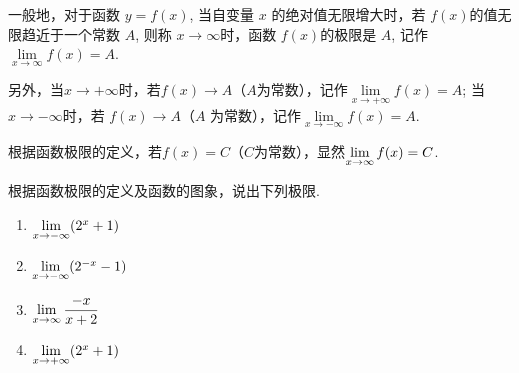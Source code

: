 一般地，对于函数 $y=f(x)$, 当自变量 $x$ 的绝对值无限增大时，若 $f(x)$的值无限趋近于一个常数 $A$, 则称 $x\to\infty$时，函数 $f(x)$的极限是 $A$, 记作$\lim\limits_{x\to\infty} f(x)=A$.

另外，当$x\to+\infty$时，若$f(x)\to A$（$A$为常数），记作$\lim\limits_{x\to+\infty}f(x)=A$; 当 $x\to-\infty$时，若 $f(x)\to A$（$A$ 为常数），记作$\lim\limits_{x\to-\infty}f(x)=A$.

根据函数极限的定义，若$f(x)=C$（$C$为常数），显然$\lim\limits_{x\to \infty}f(x)=C$.

\begin{example}
根据函数极限的定义及函数的图象，说出下列极限.
\begin{multicols}{2}
\begin{enumerate}[(1)]
    \item $\lim\limits_{x\to -\infty}(2^x+1)$
    \item $\lim\limits_{x\to -\infty}(2^{-x}-1)$
    \item $\lim\limits_{x\to \infty}\dfrac{-x}{x+2}$
    \item $\lim\limits_{x\to +\infty}(2^x+1)$
\end{enumerate}    
\end{multicols}
\end{example}

